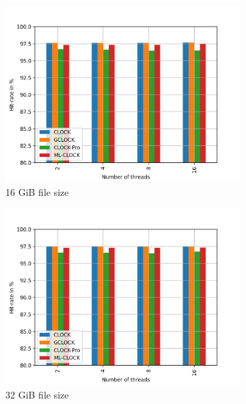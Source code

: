 \documentclass[
	12pt,
	a4paper,
	abstract,
	bibliography=totoc,
	chapterprefix,
	headings=openright,
	numbers=endperiod,
	parskip=half,
	twoside,
]{scrreprt}
\begin{document}
\begin{figure}[H]
	\centering
	\begin{subfigure}{0.4\textwidth}
		\includegraphics[width=\textwidth]{multi_16_gb_randread_zoned.jpg}		
		\caption{16 GiB file size}
		\label{fig:rw_90to10  zipf}
	\end{subfigure}
	\hfill
	\begin{subfigure}{0.4\textwidth}
		\includegraphics[width=\textwidth]{multi_32_gb_randread_zoned.jpg}		
		\caption{32 GiB file size}
		\label{fig:rw_90to10  normal}
	\end{subfigure}
	\hfill
	\begin{subfigure}{0.4\textwidth}

\end{subfigure}
\end{figure}
\end{document}
